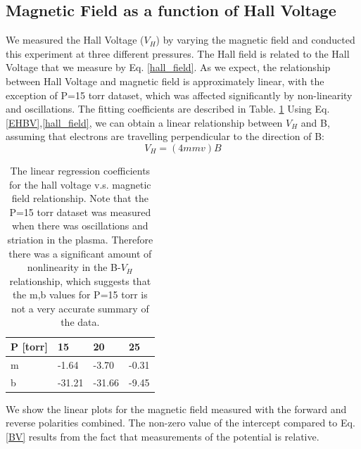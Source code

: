 \documentclass{sigchi}
\begin{document}
\subsection{Magnetic Field as a function of Hall Voltage}
We measured the Hall Voltage ($V_H$) by varying the magnetic field and conducted this experiment at three different pressures. The Hall field is related to the Hall Voltage that we measure by Eq. \ref{hall_field}. As we expect, the relationship between Hall Voltage and magnetic field is approximately linear, with the exception of P=15 torr dataset, which was affected significantly by non-linearity and oscillations.  The fitting coefficients are described in Table. \ref{fit} Using Eq.\ref{EHBV},\ref{hall_field}, we can obtain a linear relationship between $V_H$ and B, assuming that electrons are travelling perpendicular to the direction of B: 
\begin{equation}
V_H = (4mm v)B
\label{BV}
\end{equation}
\begin{table}[]
\centering
\caption{The linear regression coefficients for the hall voltage v.s. magnetic field relationship. Note that the P=15 torr dataset was measured when there was oscillations and striation in the plasma. Therefore there was a significant amount of nonlinearity in the B-$V_H$ relationship, which suggests that the m,b values for P=15 torr is not a very accurate summary of the data.}
\label{fit}
\begin{tabular}{|l|l|l|l|}
\hline
P {[}torr{]} & 15     & 20     & 25    \\ \hline
m            & -1.64  & -3.70  & -0.31 \\ \hline
b            & -31.21 & -31.66 & -9.45 \\ \hline
\end{tabular}
\end{table}
We show the linear plots for the magnetic field measured with the forward and reverse polarities combined. The non-zero value of the intercept compared to Eq. \ref{BV} results from the fact that measurements of the potential is relative.
\end{document}
